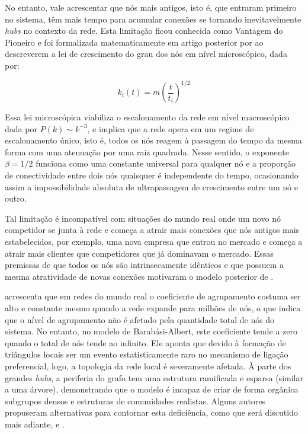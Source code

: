 \documentclass[12pt,oneside,a4paper,brazil,sumario=tradicional]{abntex2}
\begin{document}
No entanto, vale acrescentar que nós mais antigos, isto é, que entraram primeiro no sistema, têm mais tempo para acumular conexões se tornando inevitavelmente \textit{hubs} no contexto da rede. Esta limitação ficou conhecida como Vantagem do Pioneiro e foi formalizada matematicamente em artigo posterior por  ao descreverem a lei de crescimento do grau dos nós em nível microscópico, dada por:

\[k_{i}(t) = m\left(\frac{t}{t_{i}}\right)^{1/2}\]

Essa lei microscópica viabiliza o escalonamento da rede em nível macroscópico dada por $P(k) \sim k^{-3}$, e implica que a rede opera em um regime de escalonamento único, isto é, todos os nós reagem à passagem do tempo da mesma forma com uma atenuação por uma raiz quadrada. Nesse sentido, o exponente $\beta = 1/2$ funciona como uma constante universal para qualquer nó e a proporção de conectividade entre dois nós quaisquer é independente do tempo, ocasionando assim a impossibilidade absoluta de ultrapassagem de crescimento entre um nó e outro.

Tal limitação é incompatível com situações do mundo real onde um novo nó competidor se junta à rede e começa a atrair mais conexões que nós antigos mais estabelecidos, por exemplo, uma nova empresa que entrou no mercado e começa a atrair mais clientes que competidores que já dominavam o mercado. Essas premissas de que todos os nós são intrinsecamente idênticos e que possuem a mesma atratividade de novas conexões motivaram o modelo posterior de .

 acrescenta que em redes do mundo real o coeficiente de agrupamento costuma ser alto e constante mesmo quando a rede expande para milhões de nós, o que indica que o nível de agrupamento não é afetado pela quantidade total de nós do sistema. No entanto, no modelo de Barabási-Albert, este coeficiente tende a zero quando o total de nós tende ao infinito. Ele aponta que devido à formação de triângulos locais ser um evento estatisticamente raro no mecanismo de ligação preferencial, logo, a topologia da rede local é severamente afetada. À parte dos grandes \textit{hubs}, a periferia do grafo tem uma estrutura ramificada e esparsa (similar a uma árvore), demonstrando que o modelo é incapaz de criar de forma orgânica subgrupos densos e estruturas de comunidades realistas. Alguns autores propuseram alternativas para contornar esta deficiência, como  que será discutido mais adiante, e .
\end{document}
